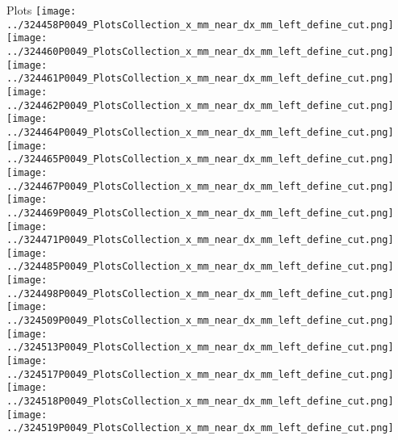\documentclass{beamer}
\begin{document}
\begin{frame}\tiny
        \begin{block}{Plots}
		  \centering
                \texttt{[image: ../324458P0049\_PlotsCollection\_x\_mm\_near\_dx\_mm\_left\_define\_cut.png]}
                \texttt{[image: ../324460P0049\_PlotsCollection\_x\_mm\_near\_dx\_mm\_left\_define\_cut.png]}
                \texttt{[image: ../324461P0049\_PlotsCollection\_x\_mm\_near\_dx\_mm\_left\_define\_cut.png]}
                \texttt{[image: ../324462P0049\_PlotsCollection\_x\_mm\_near\_dx\_mm\_left\_define\_cut.png]}
                \texttt{[image: ../324464P0049\_PlotsCollection\_x\_mm\_near\_dx\_mm\_left\_define\_cut.png]}\\
                \texttt{[image: ../324465P0049\_PlotsCollection\_x\_mm\_near\_dx\_mm\_left\_define\_cut.png]}
                \texttt{[image: ../324467P0049\_PlotsCollection\_x\_mm\_near\_dx\_mm\_left\_define\_cut.png]}
                \texttt{[image: ../324469P0049\_PlotsCollection\_x\_mm\_near\_dx\_mm\_left\_define\_cut.png]}
                \texttt{[image: ../324471P0049\_PlotsCollection\_x\_mm\_near\_dx\_mm\_left\_define\_cut.png]}
                \texttt{[image: ../324485P0049\_PlotsCollection\_x\_mm\_near\_dx\_mm\_left\_define\_cut.png]}\\
                \texttt{[image: ../324498P0049\_PlotsCollection\_x\_mm\_near\_dx\_mm\_left\_define\_cut.png]}
                \texttt{[image: ../324509P0049\_PlotsCollection\_x\_mm\_near\_dx\_mm\_left\_define\_cut.png]}
                \texttt{[image: ../324513P0049\_PlotsCollection\_x\_mm\_near\_dx\_mm\_left\_define\_cut.png]}
                \texttt{[image: ../324517P0049\_PlotsCollection\_x\_mm\_near\_dx\_mm\_left\_define\_cut.png]}
                \texttt{[image: ../324518P0049\_PlotsCollection\_x\_mm\_near\_dx\_mm\_left\_define\_cut.png]}\\
                \texttt{[image: ../324519P0049\_PlotsCollection\_x\_mm\_near\_dx\_mm\_left\_define\_cut.png]}

\end{block}
\end{frame}
\end{document}
